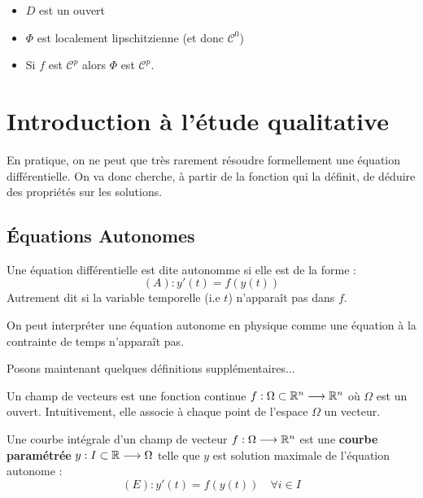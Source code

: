\begin{prop}[Flot]
    \begin{itemize}
        \item $D$ est un ouvert 
        \item $\Phi$ est localement lipschitzienne (et donc $ \mathcal{C}^0$)
        \item Si $f$ est $ \mathcal{C}^p$ alors $\Phi$ est $ \mathcal{C}^p$. 
    \end{itemize}
\end{prop}



\section{Introduction à l'étude qualitative}

En pratique, on ne peut que très rarement résoudre formellement une équation différentielle. 
On va donc cherche, à partir de la fonction qui la définit, de déduire des propriétés sur les solutions. 

\subsection{Équations Autonomes}

\begin{definition}
    Une équation différentielle est dite autonomme si elle est de la forme : 
        \[ (A) : y'(t) = f(y(t)) \] 
    Autrement dit si la variable temporelle (i.e $t$) n'apparaît pas dans $f$. 
\end{definition}

On peut interpréter une équation autonome en physique comme une équation à la contrainte de temps n'apparaît pas. 

Posons maintenant quelques définitions supplémentaires... 

\begin{definition}
    Un champ de vecteurs est une fonction continue $f : \Omega \subset \mathbb{R}^n \longrightarrow \mathbb{R}^n$ où $\Omega$ est un ouvert. 
    Intuitivement, elle associe à chaque point de l'espace $\Omega$ un vecteur. 
\end{definition}

\begin{definition}
    Une courbe intégrale d'un champ de vecteur $f : \Omega \longrightarrow \mathbb{R}^n$ est une \textbf{courbe paramétrée} 
    $y : I \subset \mathbb{R} \longrightarrow \Omega$ telle que $y$ est solution maximale de l'équation autonome :
        \[ (E) : y'(t) = f(y(t)) \quad \forall i \in I \] 
\end{definition}

